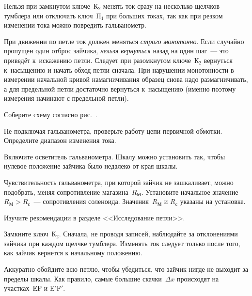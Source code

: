 Нельзя при замкнутом ключе~К$_2$ менять ток сразу на несколько щелчков тумблера или
отключать ключ~$\text{П}_1$ при больших токах, так как при резком изменении
тока можно повредить гальванометр.

При движении по петле ток должен меняться \emph{строго монотонно}.
Если случайно пропущен один отброс зайчика, \emph{нельзя вернуться}
назад на один шаг~--- это приведёт к~искажению петли. Следует при разомкнутом
ключе~К$_2$ вернуться к~насыщению и начать обход петли сначала. 
При нарушении монотонности в измерении начальной кривой
намагничивания образец снова надо размагничивать, а для предельной петли
достаточно вернуться к~насыщению (именно поэтому измерения начинают с предельной
петли).

\begin{lab:task}



	\item Соберите схему согласно рис.~.

	\item Не подключая гальванометра, проверьте работу цепи первичной обмотки.
Определите диапазон изменения тока.

	\item Включите осветитель гальванометра. Шкалу можно установить так, чтобы нулевое
    положение зайчика было недалеко от края шкалы.
    
    Чувствительность гальванометра, при которой зайчик не зашкаливает,
можно подобрать, меняя сопротивление магазина~$R_{М}$. Установите начальное значение~$R_М>R_{с}$~--- сопротивления
соленоида. Значения~$R_{М}$ и $R_{с}$ указаны на установке.

	
	\begin{lab:warning}
		Изучите рекомендации в разделе <<Исследование петли>>.
	\end{lab:warning}

	\item Замкните ключ~К$_2$. Сначала, не проводя записей, наблюдайте за
отклонениями зайчика при каждом щелчке тумблера. Изменять ток следует только
после того, как зайчик вернется к начальному положению.

	Аккуратно обойдите всю петлю, чтобы убедиться, что зайчик нигде не выходит
за пределы шкалы. Как правило, самые большие скачки~$\Delta x$ происходят 
на участках~EF и E$'$F$'$.


\end{lab:task}
